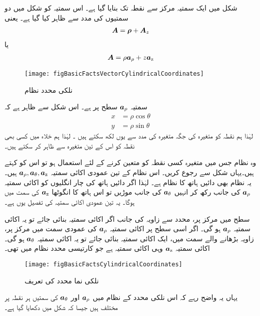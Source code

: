 شکل   میں ایک سمتیہ   مرکز سے نقطہ  تک بنایا گیا ہے۔ اس سمتیہ کو شکل میں دو سمتیوں کی مدد سے ظاہر کیا گیا ہے۔ یعنی
\begin{align}
{\ensuremath{{\boldsymbol{A}}}}={{\boldsymbol{\rho}}}+{{\boldsymbol{A}}}_z
\end{align}
یا
\begin{align}
{\ensuremath{{\boldsymbol{A}}}}=\rho {\boldsymbol{a}}_{\rho}+z {\boldsymbol{a}}_{\textup{z}}
\end{align}
%
\begin{figure}
\centering
\texttt{[image: figBasicFactsVectorCylindricalCoordinates]}
\caption{نلکی محدد نظام}
\label{شکل_حقائق_نلکی_نظام_ایک_سمتیہ}
\end{figure}
سمتیہ ${\boldsymbol{a}}_{\rho}$ سطح  پر ہے۔ اس شکل سے ظاہر ہے کہ
\begin{align}
x&=\rho \cos \theta\\
y&=\rho \sin \theta
\end{align}
لہٰذا ہم نقطہ  کو متغیرہ  کی جگہ متغیرہ  کی مدد سے یوں لکھ سکتے ہیں ۔ لہٰذا ہم خلاء میں کسی بھی نقطہ کو اس کے تین متغیرہ  سے ظاہر کر سکتے ہیں۔

	وہ نظام جس میں متغیرہ   کسی نقطہ کو متعین کرنے کے لئے استعمال ہو تو اس کو  کہتے ہیں۔یہاں شکل   سے رجوع کریں۔ اس نظام کے تین عمودی  اکائی سمتیہ ${\boldsymbol{a}}_{\rho},{\boldsymbol{a}}_{\theta},{\boldsymbol{a}}_{\textup{z}}$ ہیں۔ یہ نظام بھی دائیں ہاتھ کا نظام ہے۔ لہٰذا اگر دائیں ہاتھ کی چار انگلیوں کو اکائی سمتیہ ${\boldsymbol{a}}_{\rho}$ کی جانب رکھ کر انہیں ${\boldsymbol{a}}_{\theta}$ کی جانب موڑیں تو اس ہاتھ کا انگوٹھا ${\boldsymbol{a}}_{\textup{z}}$ کی سمت میں ہوگا۔ یہ تین عمودی اکائی سمتیہ کی تفصیل یوں ہے۔

سطح  میں مرکز پر، محدد  سے  زاویہ  کی  جانب اگر  اکائی سمتیہ بنائی جائے تو یہ اکائی سمتیہ ${\boldsymbol{a}}_{\rho}$ ہو گی۔ اگر اسی سطح   پر اکائی سمتیہ ${\boldsymbol{a}}_{\rho}$ کی عمودی سمت میں مرکز پر، زاویہ   بڑھانے والے سمت میں، ایک اکائی سمتیہ بنائی جائے تو یہ  اکائی سمتیہ ${\boldsymbol{a}}_{\theta}$ ہو گی۔ اکائی سمتیہ ${\boldsymbol{a}}_{\textup{z}}$ وہی اکائی سمتیہ ہے جو کارتیسی محدد نظام میں تھی۔ 
\begin{figure}
\centering
\texttt{[image: figBasicFactsCylindricalCoordinates]}
\caption{نلکی نما محدد کی تعریف}
\label{شکل_حقائق_نلکی_نظام_تعریف}
\end{figure}
	یہاں یہ واضح رہے کہ اس نلکی محدد کے نظام  میں ${\boldsymbol{a}}_{\rho}$ اور  ${\boldsymbol{a}}_{\theta}$ کی سمتیں ہر نقطہ پر مختلف ہیں جیسا کہ شکل  میں دکھایا گیا ہے۔

